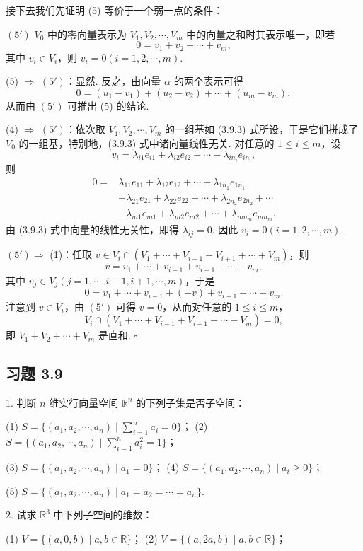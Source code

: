 \documentclass[UTF8,12pt,a4paper,fontset=fandol]{ctexart}
\begin{document}
接下去我们先证明 (5) 等价于一个弱一点的条件：

$(5')$ $V_0$ 中的零向量表示为 $V_1,V_2,\cdots,V_m$ 中的向量之和时其表示唯一，即若
\[
0=v_1+v_2+\cdots+v_m,
\]
其中 $v_i\in V_i$，则 $v_i=0(i=1,2,\cdots,m)$.

(5) $\Rightarrow$ $(5')$：显然. 反之，由向量 $\alpha$ 的两个表示可得
\[
0=(u_1-v_1)+(u_2-v_2)+\cdots+(u_m-v_m),
\]
从而由 $(5')$ 可推出 (5) 的结论.

(4) $\Rightarrow$ $(5')$：依次取 $V_1,V_2,\cdots,V_m$ 的一组基如 (3.9.3) 式所设，于是它们拼成了 $V_0$ 的一组基，特别地，(3.9.3) 式中诸向量线性无关. 对任意的 $1\leq i\leq m$，设
\[
v_i=\lambda_{i1}e_{i1}+\lambda_{i2}e_{i2}+\cdots+\lambda_{in_i}e_{in_i},
\]
则
\[
\begin{aligned}
0={}&\lambda_{11}e_{11}+\lambda_{12}e_{12}+\cdots+\lambda_{1n_1}e_{1n_1}\\
&+\lambda_{21}e_{21}+\lambda_{22}e_{22}+\cdots+\lambda_{2n_2}e_{2n_2}+\cdots\\
&+\lambda_{m1}e_{m1}+\lambda_{m2}e_{m2}+\cdots+\lambda_{mn_m}e_{mn_m}.
\end{aligned}
\]
由 (3.9.3) 式中向量的线性无关性，即得 $\lambda_{ij}=0$. 因此 $v_i=0(i=1,2,\cdots,m)$.

$(5')\Rightarrow$ (1)：任取 $v\in V_i\cap(V_1+\cdots+V_{i-1}+V_{i+1}+\cdots+V_m)$，则
\[
v=v_1+\cdots+v_{i-1}+v_{i+1}+\cdots+v_m,
\]
其中 $v_j\in V_j(j=1,\cdots,i-1,i+1,\cdots,m)$，于是
\[
0=v_1+\cdots+v_{i-1}+(-v)+v_{i+1}+\cdots+v_m.
\]
注意到 $v\in V_i$，由 $(5')$ 可得 $v=0$，从而对任意的 $1\leq i\leq m$，
\[
V_i\cap(V_1+\cdots+V_{i-1}+V_{i+1}+\cdots+V_m)=0,
\]
即 $V_1+V_2+\cdots+V_m$ 是直和. $\square$

\subsection*{习题 3.9}

1. 判断 $n$ 维实行向量空间 $\mathbb{R}^n$ 的下列子集是否子空间：

(1) $S=\{(a_1,a_2,\cdots,a_n)\mid \sum_{i=1}^n a_i=0\}$；\qquad
(2) $S=\{(a_1,a_2,\cdots,a_n)\mid \sum_{i=1}^n a_i^2=1\}$；

(3) $S=\{(a_1,a_2,\cdots,a_n)\mid a_1=0\}$；\qquad
(4) $S=\{(a_1,a_2,\cdots,a_n)\mid a_i\geq 0\}$；

(5) $S=\{(a_1,a_2,\cdots,a_n)\mid a_1=a_2=\cdots=a_n\}$.

2. 试求 $\mathbb{R}^3$ 中下列子空间的维数：

(1) $V=\{(a,0,b)\mid a,b\in\mathbb{R}\}$；\qquad
(2) $V=\{(a,2a,b)\mid a,b\in\mathbb{R}\}$；
\end{document}
